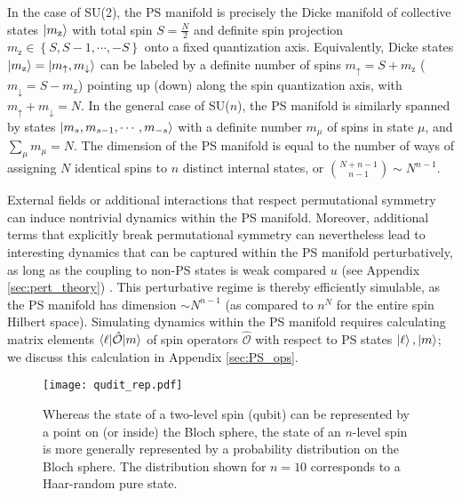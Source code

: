 \documentclass[aps,pra,nofootinbib,twocolumn,superscriptaddress]{revtex4-2}
\renewcommand{\set}[1]{\left\{#1\right\}} %
\newcommand{\bk}{\braket} %
\newcommand{\1}{\mathds{1}}
\renewcommand{\O}{\hat{\mathcal{O}}}
\newcommand{\up}{\uparrow}
\newcommand{\dn}{\downarrow}
\newcommand{\z}{\text{z}}
\begin{document}
In the case of SU(2), the PS manifold is precisely the Dicke manifold of collective states $\ket{m_\z}$ with total spin $S=\frac{N}{2}$ and definite spin projection $m_\z\in\set{S,S-1,\cdots,-S}$ onto a fixed quantization axis.
Equivalently, Dicke states $\ket{m_\z}=\ket{m_\up,m_\dn}$ can be labeled by a definite number of spins $m_\up=S+m_\z$ ($m_\dn=S-m_\z$) pointing up (down) along the spin quantization axis, with $m_\up+m_\dn=N$.
In the general case of SU($n$), the PS manifold is similarly spanned by states $\ket{m_s,m_{s-1},\cdots,m_{-s}}$ with a definite number $m_\mu$ of spins in state $\mu$, and $\sum_\mu m_\mu=N$.
The dimension of the PS manifold is equal to the number of ways of assigning $N$ identical spins to $n$ distinct internal states, or ${N+n-1 \choose n-1} \sim N^{n-1}$.

External fields or additional interactions that respect permutational symmetry can induce nontrivial dynamics within the PS manifold.
Moreover, additional terms that explicitly break permutational symmetry can nevertheless lead to interesting dynamics that can be captured within the PS manifold perturbatively, as long as the coupling to non-PS states is weak compared $u$ (see Appendix \ref{sec:pert_theory}) \cite{bravyi2011schrieffer}.
This perturbative regime is thereby efficiently simulable, as the PS manifold has dimension $\sim N^{n-1}$ (as compared to $n^N$ for the entire spin Hilbert space).
Simulating dynamics within the PS manifold requires calculating matrix elements $\bk{\ell|\O|m}$ of spin operators $\O$ with respect to PS states $\ket\ell,\ket{m}$; we discuss this calculation in Appendix \ref{sec:PS_ops}.

\begin{figure}
\centering
\texttt{[image: qudit\_rep.pdf]}
\caption{
Whereas the state of a two-level spin (qubit) can be represented by a point on (or inside) the Bloch sphere, the state of an $n$-level spin is more generally represented by a probability distribution on the Bloch sphere.
The distribution shown for $n=10$ corresponds to a Haar-random pure state.
}
\label{fig:spin_dist}
\end{figure}
\end{document}
